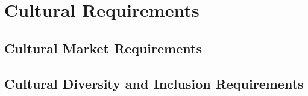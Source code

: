 \section{Cultural Requirements}
\subsection{Cultural Market Requirements}
\subsection{Cultural Diversity and Inclusion Requirements}